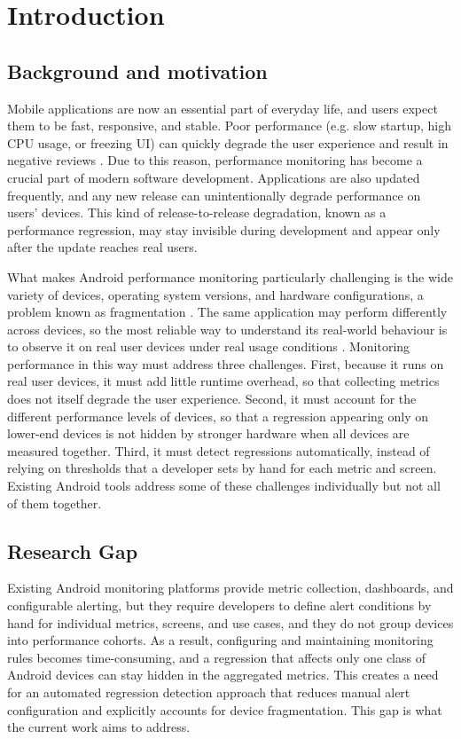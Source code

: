 \chapter{Introduction}
\label{chap:intro}

\section{Background and motivation}
Mobile applications are now an essential part of everyday life, and users expect them to be fast, responsive, and
stable. Poor performance (e.g. slow startup, high CPU usage, or freezing UI) can quickly degrade the user experience and result in negative reviews \cite{Tang, FirebasePerf}. Due to this reason, performance monitoring has become a crucial part of modern software development. Applications are also updated frequently, and any new release can unintentionally degrade performance on users' devices. This kind of release-to-release degradation, known as a performance regression, may stay invisible during development and appear only after the update reaches real users.

What makes Android performance monitoring particularly challenging is the wide variety of devices, operating system versions, and hardware configurations, a problem known as fragmentation \cite{Fragmentation}. The same application may perform differently across devices, so the most reliable way to understand its real-world behaviour is to observe it on real user devices under real usage conditions \cite{Zikan}. Monitoring performance in this way must address three challenges. First, because it runs on real user devices, it must add little runtime overhead, so that collecting metrics does not itself degrade the user experience. Second, it must account for the different performance levels of devices, so that a regression appearing only on lower-end devices is not hidden by stronger hardware when all devices are measured together. Third, it must detect regressions automatically, instead of relying on thresholds that a developer sets by hand for each metric and screen. Existing Android tools address some of these challenges individually but not all of them together.

\section{Research Gap}

Existing Android monitoring platforms provide metric collection, dashboards, and configurable alerting, but they require developers to define alert conditions by hand for individual metrics, screens, and use cases, and they do not group devices into performance cohorts. As a result, configuring and maintaining monitoring rules becomes time-consuming, and a regression that affects only one class of Android devices can stay hidden in the aggregated metrics. This creates a need for an automated regression detection approach that reduces manual alert configuration and explicitly accounts for device fragmentation. This gap is what the current work aims to address.

